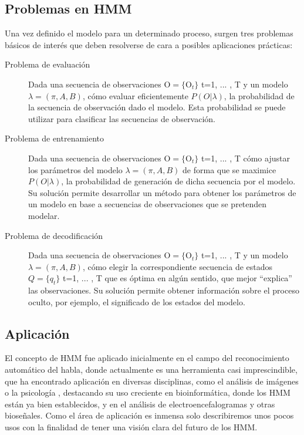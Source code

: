 \subsection{Problemas en HMM} \label{ssec:problemashmm}

Una vez definido el modelo para un determinado proceso, surgen tres problemas básicos de interés que deben resolverse de cara a posibles aplicaciones prácticas:
\begin{description}
\item [Problema de evaluación] Dada una secuencia de observaciones $\mathrm{O}=\{\mathrm{O}_t\}$ t=1, ... , T y un modelo $\lambda=(\pi, A, B)$, cómo evaluar eficientemente $P(O |\lambda )$, la probabilidad de la secuencia de observación dado el modelo. Esta probabilidad se puede utilizar para clasificar las secuencias de observación.
\item [Problema de entrenamiento] Dada una secuencia de observaciones $\mathrm{O}=\{\mathrm{O}_t\}$ t=1, ... , T cómo ajustar los parámetros del modelo $\lambda=(\pi, A, B)$ de forma que se maximice $P(O | \lambda)$, la probabilidad de generación de dicha secuencia por el modelo. Su solución permite desarrollar un método para obtener los parámetros de un modelo en base a secuencias de observaciones que se pretenden modelar.
\item [Problema de decodificación] Dada una secuencia de observaciones $\mathrm{O}=\{\mathrm{O}_t\}$ t=1, ... , T y un modelo $\lambda=(\pi, A, B)$, cómo elegir la correspondiente secuencia de estados $Q=\{q_t\}$ t=1, ... , T que es óptima en algún sentido, que mejor \enquote{explica} las observaciones. Su solución permite obtener información sobre el proceso oculto, por ejemplo, el significado de los estados del modelo. 
\end{description}

\subsection{Aplicación}
El concepto de HMM fue aplicado inicialmente en el campo del reconocimiento automático del habla\cite{rabiner1989tutorial}, donde actualmente es una herramienta casi imprescindible, que ha encontrado aplicación en diversas disciplinas, como el análisis de imágenes\cite{aas1999applications} o la psicología \cite{visser2002fitting}, destacando su uso creciente en bioinformática, donde los HMM están ya bien establecidos\cite{visser2002fitting,baldi2001bioinformatics}, y en el análisis de electroencefalogramas y otras bioseñales\cite{novak2004speech,penny1998gaussian}. Como el área de aplicación es inmensa solo describiremos unos pocos usos con la finalidad de tener una visión clara del futuro de los HMM.

